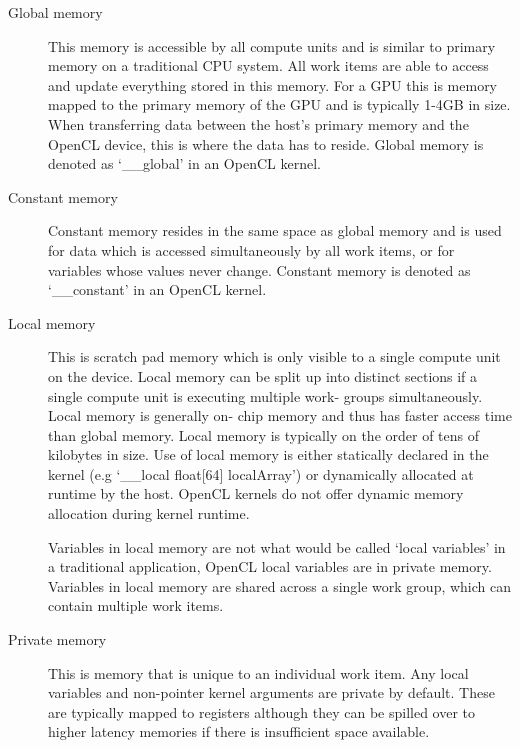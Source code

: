\begin{description}

\item[Global memory] This memory is accessible by all compute units and is
similar to primary memory on a traditional CPU system. All work items are able
to access and update everything stored in this memory. For a GPU this is memory
mapped to the primary memory of the GPU and is typically 1-4GB in size. When
transferring data between the host's primary memory and the OpenCL device, this
is where the data has to reside. Global memory is denoted as `\_\_global' in an
OpenCL kernel.

\item[Constant memory] Constant memory resides in the same space as global
memory and is used for data which is accessed simultaneously by all work items,
or for variables whose values never change. Constant memory is denoted as
`\_\_constant' in an OpenCL kernel.

\item[Local memory] This is scratch pad memory which is only visible to a single
compute unit on the device. Local memory can be split up into distinct sections
if a single compute unit is executing multiple work- groups simultaneously.
Local memory is generally on- chip memory and thus has faster access time than
global memory. Local memory is typically on the order of tens of kilobytes in
size. Use of local memory is either statically declared in the kernel (e.g
`\_\_local float[64] localArray') or dynamically allocated at runtime by the
host. OpenCL kernels do not offer dynamic memory allocation during kernel
runtime.

Variables in local memory are not what would be called `local variables' in a
traditional application, OpenCL local variables are in private memory. Variables
in local memory are shared across a single work group, which can contain
multiple work items.

\item[Private memory] This is memory that is unique to an individual work item.
Any local variables and non-pointer kernel arguments are private by default.
These are typically mapped to registers although they can be spilled over to
higher latency memories if there is insufficient space available.

\end{description}

